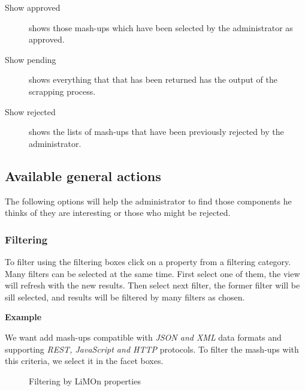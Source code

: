 \begin{description}
\item[Show approved] shows those mash-ups which have been selected by the
administrator as approved.
\item[Show pending] shows everything that that has been returned has the output of the
scrapping process.
\item[Show rejected] shows the lists of mash-ups that have been previously rejected by
the administrator.
\end{description}

\subsection{Available general actions}
\label{subsec:omravailableactions}
The following options will help the administrator to find those components he thinks of they are interesting or those who might be rejected.

\subsubsection{Filtering}
To filter using the filtering boxes click on a property from a filtering category.
Many filters can be selected at the same time. First select one of them, the view will refresh
with the new results. Then select next filter, the former filter will be sill selected, and results
will be filtered by many filters as chosen.

\textbf{Example}

We want add mash-ups compatible with \textit{JSON and XML } data formats and supporting \textit{REST, JavaScript and HTTP} protocols. To filter the mash-ups with this criteria, we select it in the facet boxes.

\begin{figure}[h]%
    \centering
    \qquad
    \caption{Filtering by LiMOn properties}%
    \label{fig:limonfiltering}%
\end{figure}

